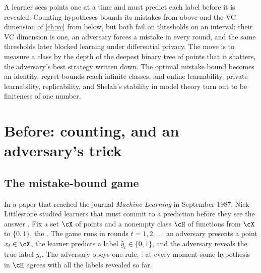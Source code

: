 \begin{refsection}
\newcommand{\littlestoneLdim}{\operatorname{Ldim}}
\newcommand{\littlestoneVC}{\operatorname{VC}}
\newcommand{\littlestoneM}{\operatorname{M}}
\newcommand{\littlestoneErr}{\operatorname{err}}
\newcommand{\littlestoneLogstar}{\log^{*}}

\begin{chaptersummary}
A learner sees points one at a time and must predict each label before it is revealed. Counting hypotheses bounds its mistakes from above and the VC dimension of \cref{ch:vc} from below, but both fail on thresholds on an interval: their VC dimension is one, an adversary forces a mistake in every round, and the same thresholds later blocked learning under differential privacy. The move is to measure a class by the depth of the deepest binary tree of points that it shatters, the adversary's best strategy written down. The optimal mistake bound becomes an identity, regret bounds reach infinite classes, and online learnability, private learnability, replicability, and Shelah's stability in model theory turn out to be finiteness of one number.
\end{chaptersummary}

\section{Before: counting, and an adversary's trick}\label{sec:littlestone:before}

\subsection{The mistake-bound game}\label{sec:littlestone:game}

In a paper that reached the journal \emph{Machine Learning} in September 1987, Nick Littlestone studied learners that must commit to a prediction before they see the answer \parencite{Littlestone1988}. Fix a set $\cX$ of points and a nonempty class $\cH$ of functions from $\cX$ to $\{0,1\}$, the . The game runs in rounds $t=1,2,\dots$: an adversary presents a point $x_t\in\cX$, the learner predicts a label $\hat y_t\in\{0,1\}$, and the adversary reveals the true label $y_t$. The adversary obeys one rule, : at every moment some hypothesis in $\cH$ agrees with all the labels revealed so far.


\end{refsection}

